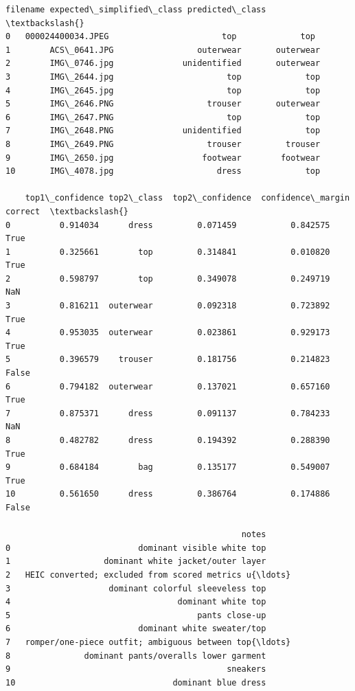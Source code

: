 \documentclass[11pt]{article}
\begin{document}
    
    \begin{Verbatim}[commandchars=\\\{\}]
             filename expected\_simplified\_class predicted\_class  \textbackslash{}
0   000024400034.JPEG                       top             top   
1        ACS\_0641.JPG                 outerwear       outerwear   
2        IMG\_0746.jpg              unidentified       outerwear   
3        IMG\_2644.jpg                       top             top   
4        IMG\_2645.jpg                       top             top   
5        IMG\_2646.PNG                   trouser       outerwear   
6        IMG\_2647.PNG                       top             top   
7        IMG\_2648.PNG              unidentified             top   
8        IMG\_2649.PNG                   trouser         trouser   
9        IMG\_2650.jpg                  footwear        footwear   
10       IMG\_4078.jpg                     dress             top   

    top1\_confidence top2\_class  top2\_confidence  confidence\_margin correct  \textbackslash{}
0          0.914034      dress         0.071459           0.842575    True   
1          0.325661        top         0.314841           0.010820    True   
2          0.598797        top         0.349078           0.249719     NaN   
3          0.816211  outerwear         0.092318           0.723892    True   
4          0.953035  outerwear         0.023861           0.929173    True   
5          0.396579    trouser         0.181756           0.214823   False   
6          0.794182  outerwear         0.137021           0.657160    True   
7          0.875371      dress         0.091137           0.784233     NaN   
8          0.482782      dress         0.194392           0.288390    True   
9          0.684184        bag         0.135177           0.549007    True   
10         0.561650      dress         0.386764           0.174886   False   

                                                notes  
0                          dominant visible white top  
1                   dominant white jacket/outer layer  
2   HEIC converted; excluded from scored metrics u{\ldots}  
3                    dominant colorful sleeveless top  
4                                  dominant white top  
5                                      pants close-up  
6                          dominant white sweater/top  
7   romper/one-piece outfit; ambiguous between top{\ldots}  
8               dominant pants/overalls lower garment  
9                                            sneakers  
10                                dominant blue dress  
    \end{Verbatim}
\end{document}
